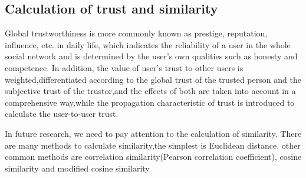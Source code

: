 \subsection{Calculation of trust and similarity}
Global trustworthiness is more commonly known as prestige, reputation, influence, etc. in 
daily life, which indicates the reliability of a user in the whole social network and is 
determined by the user's own qualities such as honesty and competence\cite{b25}. In addition, the 
value of user's trust to other users is weighted,differentiated according to the global 
trust of the trusted person and the subjective trust of the trustor,and the effects of both 
are taken into account in a comprehensive way,while the propagation characteristic of trust 
is introduced to calculate the user-to-user trust\cite{b26}.

In future research, we need to pay attention to the calculation of similarity. 
There are many methods to calculate similarity,the simplest is Euclidean distance,
other common methods are correlation similarity(Pearson correlation coefficient),
cosine similarity and modified cosine similarity\cite{b15}.